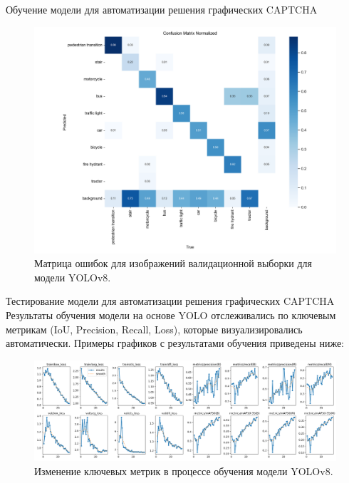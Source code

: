 \documentclass[12pt,a4paper,mathserif]{beamer}
\begin{document}

\begin{frame}{\small Обучение модели для автоматизации решения графических CAPTCHA}
    \begin{figure}
        \centering
        \includegraphics[width=0.68\linewidth]{imgs/confusion_matrix_normalized.png}
        \caption{\centering Матрица ошибок для изображений валидационной выборки для модели YOLOv8.}
    \end{figure}
\end{frame}

\begin{frame}{\footnotesize Тестирование модели для автоматизации решения графических CAPTCHA}
    \setlength{\parindent}{0.5cm}
    Результаты обучения модели на основе YOLO отслеживались по ключевым метрикам 
    (IoU, Precision, Recall, Loss), которые визуализировались автоматически. 
    Примеры графиков с результатами обучения приведены ниже:

    \begin{figure}[H]
        \centering
        \includegraphics[width=1\linewidth]{imgs/results.png}
        \caption{Изменение ключевых метрик в процессе обучения модели YOLOv8.}
    \end{figure}
\end{frame}
\end{document}
